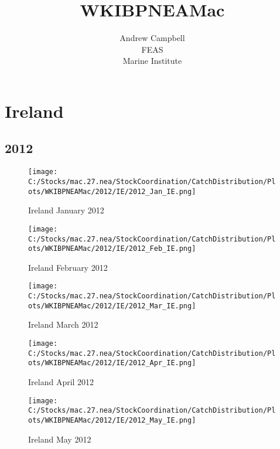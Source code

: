 \documentclass{article}
\begin{document}
\title{WKIBPNEAMac}
\author{Andrew Campbell \\ FEAS \\ Marine Institute}
\maketitle

\tableofcontents

\section{Ireland}



\newpage

\subsection{2012}



\begin{figure}[h]
	\centering
		\texttt{[image: C:/Stocks/mac.27.nea/StockCoordination/CatchDistribution/Plots/WKIBPNEAMac/2012/IE/2012\_Jan\_IE.png]}
	\caption{Ireland January 2012}
	\label{fig:2012_Jan_IE}
\end{figure}

\begin{figure}
	\centering
		\texttt{[image: C:/Stocks/mac.27.nea/StockCoordination/CatchDistribution/Plots/WKIBPNEAMac/2012/IE/2012\_Feb\_IE.png]}
	\caption{Ireland February 2012}
	\label{fig:2012_Feb_IE}
\end{figure}

\begin{figure}
	\centering
		\texttt{[image: C:/Stocks/mac.27.nea/StockCoordination/CatchDistribution/Plots/WKIBPNEAMac/2012/IE/2012\_Mar\_IE.png]}
	\caption{Ireland March 2012}
	\label{fig:2012_Mar_IE}
\end{figure}

\begin{figure}
	\centering
		\texttt{[image: C:/Stocks/mac.27.nea/StockCoordination/CatchDistribution/Plots/WKIBPNEAMac/2012/IE/2012\_Apr\_IE.png]}
	\caption{Ireland April 2012}
	\label{fig:2012_Apr_IE}
\end{figure}

\begin{figure}
	\centering
		\texttt{[image: C:/Stocks/mac.27.nea/StockCoordination/CatchDistribution/Plots/WKIBPNEAMac/2012/IE/2012\_May\_IE.png]}
	\caption{Ireland May 2012}
	\label{fig:2012_May_IE}
\end{figure}
\end{document}
